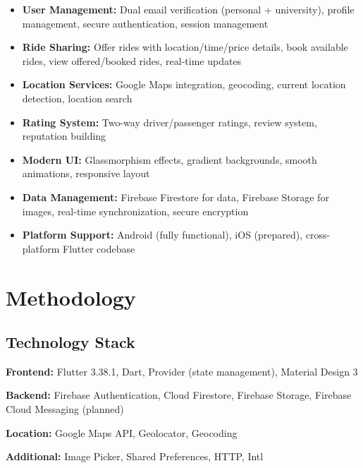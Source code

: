 \documentclass[12pt,a4paper]{article}
\begin{document}
\begin{itemize}[label=$\circ$]
    \item \textbf{User Management:} Dual email verification (personal + university), profile management, secure authentication, session management
    \item \textbf{Ride Sharing:} Offer rides with location/time/price details, book available rides, view offered/booked rides, real-time updates
    \item \textbf{Location Services:} Google Maps integration, geocoding, current location detection, location search
    \item \textbf{Rating System:} Two-way driver/passenger ratings, review system, reputation building
    \item \textbf{Modern UI:} Glassmorphism effects, gradient backgrounds, smooth animations, responsive layout
    \item \textbf{Data Management:} Firebase Firestore for data, Firebase Storage for images, real-time synchronization, secure encryption
    \item \textbf{Platform Support:} Android (fully functional), iOS (prepared), cross-platform Flutter codebase
\end{itemize}

\section{Methodology}

\subsection{Technology Stack}

\textbf{Frontend:} Flutter 3.38.1, Dart, Provider (state management), Material Design 3

\textbf{Backend:} Firebase Authentication, Cloud Firestore, Firebase Storage, Firebase Cloud Messaging (planned)

\textbf{Location:} Google Maps API, Geolocator, Geocoding

\textbf{Additional:} Image Picker, Shared Preferences, HTTP, Intl
\end{document}
